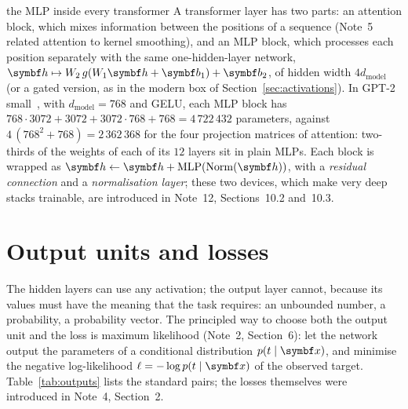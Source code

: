 \documentclass[11pt]{article}
\newcommand{\hv}{\vect{h}}
\newcommand{\vb}{\vect{b}}
\begin{document}
\begin{modern}{the MLP inside every transformer}
A transformer layer has two parts: an attention block, which mixes information between the positions of a sequence
(Note~5 related attention to kernel smoothing), and an MLP block, which processes each position separately with the same
one-hidden-layer network, $\hv \mapsto W_2\,g(W_1\hv + \vb_1) + \vb_2$, of hidden width $4d_{\mathrm{model}}$ (or a gated
version, as in the modern box of Section~\ref{sec:activations}). In GPT-2 small~\cite{radford2019}, with
$d_{\mathrm{model}} = 768$ and GELU, each MLP block has $768 \cdot 3072 + 3072 + 3072 \cdot 768 + 768 = 4\,722\,432$
parameters, against $4\,(768^2 + 768) = 2\,362\,368$ for the four projection matrices of attention: two-thirds of the
weights of each of its $12$ layers sit in plain MLPs. Each block is wrapped as $\hv \gets \hv + \mathrm{MLP}(\mathrm{Norm}(\hv))$,
with a \emph{residual connection} and a \emph{normalisation layer}; these two devices, which make very deep stacks
trainable, are introduced in Note~12, Sections~10.2 and~10.3.
\end{modern}

\section{Output units and losses}\label{sec:outputs}

The hidden layers can use any activation; the output layer cannot, because its values must have the meaning that the
task requires: an unbounded number, a probability, a probability vector. The principled way to choose both the output
unit and the loss is maximum likelihood (Note~2, Section~6): let the network output the parameters of a conditional
distribution $p(t \mid \x)$, and minimise the negative log-likelihood $\ell = -\log p(t \mid \x)$ of the observed target.
Table~\ref{tab:outputs} lists the standard pairs; the losses themselves were introduced in Note~4, Section~2.
\end{document}
